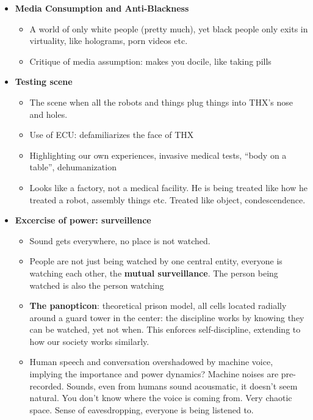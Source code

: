 \documentclass[11pt,fleqn]{book} %
\begin{document}
\begin{itemize}
{that what Weber calls "rationalization" realizes not
rationality as such but rather, in the name of
rationality, a specific form of unacknowledged
political domination}
    \item \textbf{Media Consumption and Anti-Blackness}
    \begin{itemize}
        \item A world of only white people (pretty much), yet black people only exits in virtuality, like holograms, porn videos etc.
        \item Critique of media assumption: makes you docile, like taking pills
    \end{itemize}
    \item \textbf{Testing scene}
    \begin{itemize}
        \item The scene when all the robots and things plug things into THX's nose and holes.
        \item Use of ECU: defamiliarizes the face of THX
        \item Highlighting our own experiences, invasive medical tests, \enquote{body on a table}, dehumanization
        \item Looks like a factory, not a medical facility. He is being treated like how he treated a robot, assembly things etc. Treated like object, condescendence.
    \end{itemize}
    \item \textbf{Excercise of power: surveillence}
    \begin{itemize}
        \item Sound gets everywhere, no place is not watched. 
        \item People are not just being watched by one central entity, everyone is watching each other, the \textbf{mutual surveillance}. The person being watched is also the person watching
        \item \textbf{The panopticon}: theoretical prison model, all cells located radially around a guard tower in the center: the discipline works by knowing they can be watched, yet not when. This enforces self-discipline, extending to how our society works similarly.
        \item Human speech and conversation overshadowed by machine voice, implying the importance and power dynamics? Machine noises are pre-recorded. Sounds, even from humans sound acousmatic, it doesn't seem natural. You don't know where the voice is coming from. Very chaotic space. Sense of eavesdropping, everyone is being listened to.

\end{itemize}
\end{itemize}
\end{document}
